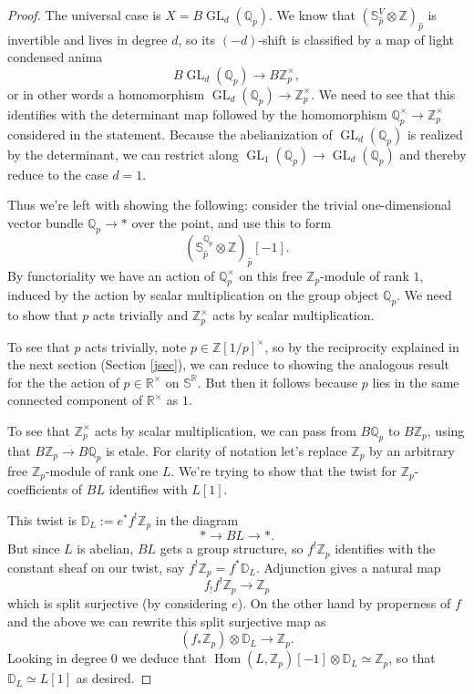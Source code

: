 \documentclass[12pt]{article}
\newcommand{\on}{\operatorname}
\newcommand{\mbb}{\mathbb}
\newcommand{\wh}{\widehat}
\begin{document}
\begin{proof}
The universal case is $X= B\on{GL}_d(\mbb{Q}_p)$.  We know that $(\mbb{S}_{\wh{p}}^V\otimes \mathbb{Z})_{\wh{p}}$ is invertible and lives in degree $d$, so its $(-d)$-shift is classified by a map of light condensed anima
$$B\on{GL}_d(\mbb{Q}_p) \to B\mbb{Z}_p^\times,$$
or in other words a homomorphism $\on{GL}_d(\mbb{Q}_p)\to \mbb{Z}_p^\times$.  We need to see that this identifies with the determinant map followed by the homomorphism $\mathbb{Q}_p^\times \to \mathbb{Z}_p^\times$ considered in the statement.  Because the abelianization of $\on{GL}_d(\mbb{Q}_p)$ is realized by the determinant, we can restrict along $\on{GL}_1(\mathbb{Q}_p)\to \on{GL}_d(\mathbb{Q}_p)$ and thereby reduce to the case $d=1$.

Thus we're left with showing the following: consider the trivial one-dimensional vector bundle $\mbb{Q}_p\to \ast$ over the point, and use this to form
$$(\mbb{S}_{\wh{p}}^{\mbb{Q}_p} \otimes \mbb{Z})_{\wh{p}}[-1].$$
By functoriality we have an action of $\mbb{Q}_p^\times$ on this free $\mbb{Z}_p$-module of rank $1$, induced by the action by scalar multiplication on the group object $\mathbb{Q}_p$.  We need to show that $p$ acts trivially and $\mathbb{Z}_p^\times$ acts by scalar multiplication.

To see that $p$ acts trivially, note $p\in\mbb{Z}[1/p]^\times$, so by the reciprocity explained in the next section (Section \ref{jsec}), we can reduce to showing the analogous result for the the action of $p\in\mbb{R}^\times$ on $\mbb{S}^{\mbb{R}}$.  But then it follows because $p$ lies in the same connected component of $\mbb{R}^\times$ as $1$.

To see that $\mbb{Z}_p^\times$ acts by scalar multiplication, we can pass from $B\mathbb{Q}_p$ to $B\mathbb{Z}_p$, using that $B\mbb{Z}_p\to B\mbb{Q}_p$ is etale.  For clarity of notation let's replace $\mbb{Z}_p$ by an arbitrary free $\mbb{Z}_p$-module of rank one $L$.  We're trying to show that the twist for $\mbb{Z}_p$-coefficients of $BL$ identifies with $L[1]$.

This twist is $\mbb{D}_L:=e^\ast f^!\mbb{Z}_p$ in the diagram
$$\ast \to BL \to \ast.$$
But since $L$ is abelian, $BL$ gets a group structure, so $f^!\mbb{Z}_p$ identifies with the constant sheaf on our twist, say $f^!\mbb{Z}_p = f^\ast \mbb{D}_L$.  Adjunction gives a natural map
$$f_! f^! \mbb{Z}_p \to \mbb{Z}_p$$
which is split surjective (by considering $e$).  On the other hand by properness of $f$ and the above we can rewrite this split surjective map as
$$(f_\ast \mbb{Z}_p)\otimes \mbb{D}_L \to \mbb{Z}_p.$$
Looking in degree $0$ we deduce that $\on{Hom}(L,\mbb{Z}_p)[-1]\otimes \mbb{D}_L\simeq \mathbb{Z}_p$, so that $\mbb{D}_L\simeq L[1]$ as desired.

\end{proof}
\end{document}
